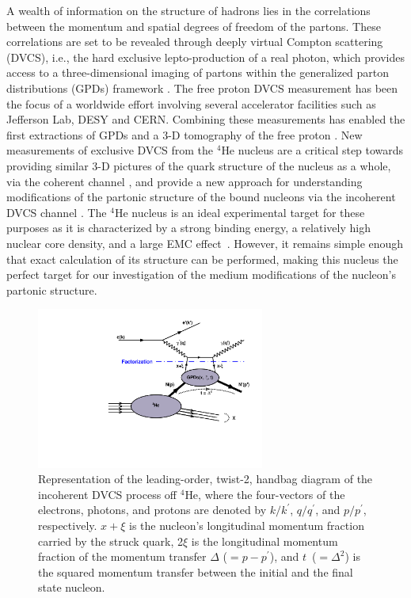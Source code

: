 \documentclass[twocolumn,nofootinbib,showpacs,prl,superscriptaddress,secnumarabic,amssymb,nobibnotes,aps,floatfix]{revtex4}
\begin{document}
A wealth of information on the structure of hadrons lies in the correlations 
between the momentum and spatial degrees of freedom of the partons. These 
correlations are set to be revealed through deeply virtual Compton scattering 
(DVCS), i.e., the hard exclusive lepto-production of a real photon, which 
provides access to a three-dimensional imaging of partons within the 
generalized parton distributions (GPDs) framework 
\cite{Mueller:1998fv,Ji:1996ek,Ji:1996nm,Radyushkin:1996nd,Radyushkin:1997ki}.   
The free proton DVCS measurement has been the focus of a worldwide effort 
\cite{Stepanyan:2001sm,Airapetian:2001yk,Airapetian:2006zr,Chekanov:2003ya,Aktas:2005ty,Chen:2006na,Munoz 
Camacho:2006hx,Girod:2007aa,Mazouz:2007aa,Gavalian:2009,Seder:2015,Pisano:2015,Jo:2015ema}
involving several accelerator facilities such as Jefferson Lab, DESY and  
CERN. Combining these measurements has enabled the first extractions of GPDs 
and a 3-D tomography of the free proton \cite{Guidal:2013rya,Dupre:2016mai}.  
New measurements of exclusive DVCS from the $^{4}$He nucleus are a critical 
step towards providing similar 3-D pictures of the quark structure of the 
nucleus as a whole, via the coherent channel 
\cite{Airapetian:2009cga,Hattawy:2017woc}, and provide a new approach for 
understanding modifications of the partonic structure of the bound nucleons via 
the incoherent DVCS channel \cite{simonetta_2,Guzey:2006xi,Guzey:2008fe}. The 
$^{4}$He nucleus is an ideal experimental target for these purposes as it is 
characterized by a strong binding energy, a relatively high nuclear 
core density, and a large EMC effect~\cite{JSeely}. However, it remains simple 
enough that exact calculation of its structure 
can be performed, making this nucleus the perfect target for our investigation of the 
medium modifications of the nucleon's partonic structure. 


\begin{figure}[tb]
\includegraphics[width=7.5cm]{figs/handbag_incoherent.pdf}
\caption{Representation of the leading-order, twist-2, handbag diagram of the 
   incoherent DVCS process off $^4$He, where the four-vectors of the electrons, 
   photons, and protons are denoted by $k/k^\prime$, $q/q^\prime$, and 
   $p/p^\prime$, respectively. $x+\xi$ is the nucleon’s longitudinal momentum 
   fraction carried by the struck quark, 2$\xi$ is the longitudinal momentum 
   fraction of the momentum transfer $\Delta$ ($= p - p^\prime$), and 
   $t$~($=\Delta^2$) is the squared momentum transfer between the initial and
   the final state nucleon.}
\label{fig:diags}
\end{figure}
\end{document}
